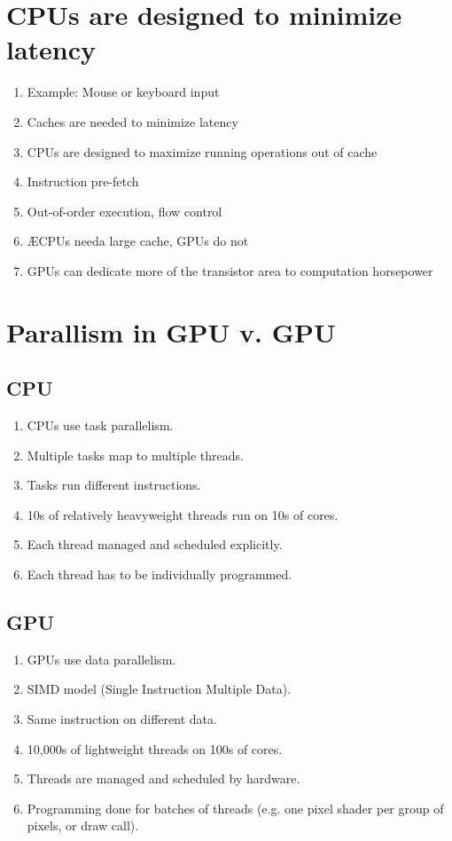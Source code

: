 \section{CPUs are designed to minimize latency}
\begin{enumerate}
\item Example: Mouse or keyboard input
\item Caches are needed to minimize latency
\item CPUs are designed to maximize running operations out of cache
\item Instruction pre-fetch
\item Out-of-order execution, flow control
\item ÆCPUs needa large cache, GPUs do not
\item GPUs can dedicate more of the transistor area to computation horsepower
\end{enumerate}

\section{Parallism in GPU v. GPU}
\subsection{CPU}
\begin{enumerate}
\item CPUs use task parallelism.
\item Multiple tasks map to multiple threads.
\item Tasks run different instructions.
\item 10s of relatively heavyweight threads run on 10s of cores.
\item Each thread managed and scheduled explicitly.
\item Each thread has to be individually programmed. 
\end{enumerate}
\subsection{GPU}
\begin{enumerate}
\item GPUs use data parallelism.
\item SIMD model (Single Instruction Multiple Data).
\item Same instruction on different data.
\item 10,000s of lightweight threads on 100s of cores.
\item Threads are managed and scheduled by hardware.
\item Programming done for batches of threads (e.g. one pixel shader per group of pixels, or draw call).
\end{enumerate}

